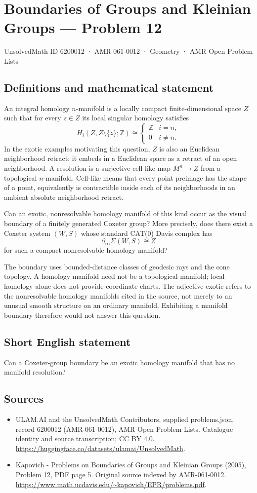 \documentclass[11pt,a4paper]{article}
\begin{document}
\section*{Boundaries of Groups and Kleinian Groups — Problem 12}\label{6200012}
{\small UnsolvedMath ID 6200012 · AMR-061-0012 · Geometry · AMR Open Problem Lists}
\subsection{Definitions and mathematical statement}
An integral homology $n$-manifold is a locally compact finite-dimensional space $Z$ such that for every $z\in Z$ its local singular homology satisfies
\[
 H_i(Z,Z\setminus\{z\};\mathbb Z)\cong
 \begin{cases}\mathbb Z&i=n,\\0&i\ne n.\end{cases}
\]
In the exotic examples motivating this question, $Z$ is also an Euclidean neighborhood retract: it embeds in a Euclidean space as a retract of an open neighborhood. A resolution is a surjective cell-like map $M^n\to Z$ from a topological $n$-manifold. Cell-like means that every point preimage has the shape of a point, equivalently is contractible inside each of its neighborhoods in an ambient absolute neighborhood retract.

Can an exotic, nonresolvable homology manifold of this kind occur as the visual boundary of a finitely generated Coxeter group? More precisely, does there exist a Coxeter system $(W,S)$ whose standard CAT(0) Davis complex has
\[
 \partial_\infty\Sigma(W,S)\cong Z
\]
for such a compact nonresolvable homology manifold?

The boundary uses bounded-distance classes of geodesic rays and the cone topology. A homology manifold need not be a topological manifold; local homology alone does not provide coordinate charts. The adjective exotic refers to the nonresolvable homology manifolds cited in the source, not merely to an unusual smooth structure on an ordinary manifold. Exhibiting a manifold boundary therefore would not answer this question.
\subsection{Short English statement}
Can a Coxeter-group boundary be an exotic homology manifold that has no manifold resolution?
\subsection{Sources}
\begin{itemize}
\item[S1] ULAM.AI and the UnsolvedMath Contributors, supplied problems.json, record 6200012 (AMR-061-0012), AMR Open Problem Lists. Catalogue identity and source transcription; CC BY 4.0.
\url{https://huggingface.co/datasets/ulamai/UnsolvedMath}.
\item[S2] Kapovich - Problems on Boundaries of Groups and Kleinian Groups (2005), Problem 12, PDF page 5. Original source indexed by AMR-061-0012.
\url{https://www.math.ucdavis.edu/~kapovich/EPR/problems.pdf}.
\end{itemize}
\end{document}
